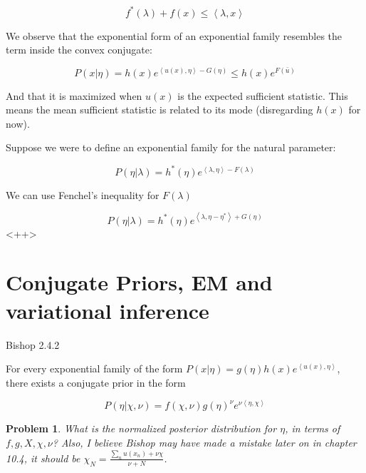 \documentclass[a4paper]{article}
\newtheorem{problem}{Problem}[section]
\begin{document}
\begin{equation}
  f^*( \lambda) + f(x) \leq \left< \lambda, x \right>
  \label{Fenchel's inequality}
\end{equation}

We observe that the exponential form of an exponential family resembles the term inside the convex conjugate:

\begin{equation}
  P( x \vert \eta) = h(x) e^{ \left< u(x), \eta \right> - G(\eta) } \leq h(x) e^{ F( \bar{u} ) }
  \label{}
\end{equation}

And that it is maximized when $u(x)$ is the expected sufficient statistic.  This means the mean sufficient statistic is related to its mode (disregarding $h(x)$ for now).  

Suppose we were to define an exponential family for the natural parameter:

\begin{equation}
  P( \eta \vert \lambda ) = h^*(\eta) e^{ \left< \lambda, \eta \right> - F(\lambda) }
  \label{}
\end{equation}

We can use Fenchel's inequality for $F(\lambda)$

\begin{equation}
  P( \eta \vert \lambda ) = h^*(\eta) e^{ \left< \lambda, \eta - \eta^* \right> + G(\eta) }
  \label{<++>}
\end{equation}<++>

\section{Conjugate Priors, EM and variational inference}

Bishop 2.4.2

For every exponential family of the form $P( x \vert \eta) = g(\eta) h(x) e^{ \left< u(x), \eta \right>}$, there exists a conjugate prior in the form

\begin{equation}
  P( \eta \vert \chi, \nu) = f( \chi, \nu) g(\eta)^\nu e^{ \nu \left< \eta, \chi \right> }
  \label{conjugate prior}
\end{equation}

\begin{problem}
  What is the normalized posterior distribution for $\eta$, in terms of $f,g,X,\chi,\nu$?  Also, I believe Bishop may have made a mistake later on in chapter 10.4, it should be $\chi_N = \frac{ \sum_n u(x_n) + \nu \chi}{\nu + N }$.
\end{problem}
\end{document}
